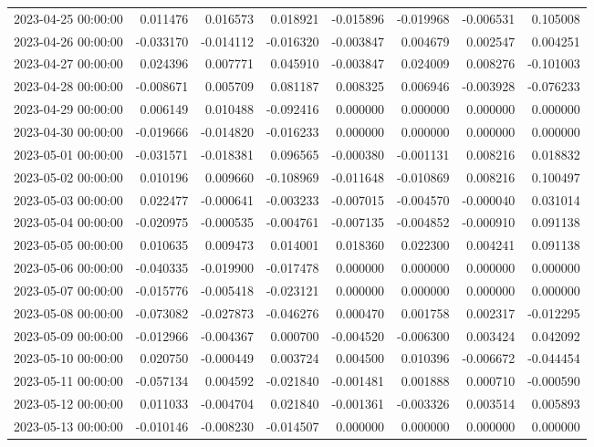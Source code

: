 \begin{tabular}{lrrrrrrr}
2023-04-25 00:00:00 & 0.011476 & 0.016573 & 0.018921 & -0.015896 & -0.019968 & -0.006531 & 0.105008 \\
2023-04-26 00:00:00 & -0.033170 & -0.014112 & -0.016320 & -0.003847 & 0.004679 & 0.002547 & 0.004251 \\
2023-04-27 00:00:00 & 0.024396 & 0.007771 & 0.045910 & -0.003847 & 0.024009 & 0.008276 & -0.101003 \\
2023-04-28 00:00:00 & -0.008671 & 0.005709 & 0.081187 & 0.008325 & 0.006946 & -0.003928 & -0.076233 \\
2023-04-29 00:00:00 & 0.006149 & 0.010488 & -0.092416 & 0.000000 & 0.000000 & 0.000000 & 0.000000 \\
2023-04-30 00:00:00 & -0.019666 & -0.014820 & -0.016233 & 0.000000 & 0.000000 & 0.000000 & 0.000000 \\
2023-05-01 00:00:00 & -0.031571 & -0.018381 & 0.096565 & -0.000380 & -0.001131 & 0.008216 & 0.018832 \\
2023-05-02 00:00:00 & 0.010196 & 0.009660 & -0.108969 & -0.011648 & -0.010869 & 0.008216 & 0.100497 \\
2023-05-03 00:00:00 & 0.022477 & -0.000641 & -0.003233 & -0.007015 & -0.004570 & -0.000040 & 0.031014 \\
2023-05-04 00:00:00 & -0.020975 & -0.000535 & -0.004761 & -0.007135 & -0.004852 & -0.000910 & 0.091138 \\
2023-05-05 00:00:00 & 0.010635 & 0.009473 & 0.014001 & 0.018360 & 0.022300 & 0.004241 & 0.091138 \\
2023-05-06 00:00:00 & -0.040335 & -0.019900 & -0.017478 & 0.000000 & 0.000000 & 0.000000 & 0.000000 \\
2023-05-07 00:00:00 & -0.015776 & -0.005418 & -0.023121 & 0.000000 & 0.000000 & 0.000000 & 0.000000 \\
2023-05-08 00:00:00 & -0.073082 & -0.027873 & -0.046276 & 0.000470 & 0.001758 & 0.002317 & -0.012295 \\
2023-05-09 00:00:00 & -0.012966 & -0.004367 & 0.000700 & -0.004520 & -0.006300 & 0.003424 & 0.042092 \\
2023-05-10 00:00:00 & 0.020750 & -0.000449 & 0.003724 & 0.004500 & 0.010396 & -0.006672 & -0.044454 \\
2023-05-11 00:00:00 & -0.057134 & 0.004592 & -0.021840 & -0.001481 & 0.001888 & 0.000710 & -0.000590 \\
2023-05-12 00:00:00 & 0.011033 & -0.004704 & 0.021840 & -0.001361 & -0.003326 & 0.003514 & 0.005893 \\
2023-05-13 00:00:00 & -0.010146 & -0.008230 & -0.014507 & 0.000000 & 0.000000 & 0.000000 & 0.000000 \\

\end{tabular}
